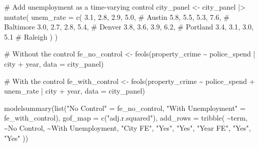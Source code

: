 \documentclass[
  letterpaper,
  DIV=11,
  numbers=noendperiod]{scrreprt}
\newenvironment{Shaded}{\begin{snugshade}}{\end{snugshade}}
\newcommand{\AttributeTok}[1]{\textcolor[rgb]{0.40,0.45,0.13}{#1}}
\newcommand{\CommentTok}[1]{\textcolor[rgb]{0.37,0.37,0.37}{#1}}
\newcommand{\FloatTok}[1]{\textcolor[rgb]{0.68,0.00,0.00}{#1}}
\newcommand{\FunctionTok}[1]{\textcolor[rgb]{0.28,0.35,0.67}{#1}}
\newcommand{\NormalTok}[1]{\textcolor[rgb]{0.00,0.23,0.31}{#1}}
\newcommand{\OtherTok}[1]{\textcolor[rgb]{0.00,0.23,0.31}{#1}}
\newcommand{\SpecialCharTok}[1]{\textcolor[rgb]{0.37,0.37,0.37}{#1}}
\newcommand{\StringTok}[1]{\textcolor[rgb]{0.13,0.47,0.30}{#1}}
\begin{document}
\begin{Shaded}
\begin{Highlighting}[]
\CommentTok{\# Add unemployment as a time{-}varying control}
\NormalTok{city\_panel }\OtherTok{\textless{}{-}}\NormalTok{ city\_panel }\SpecialCharTok{|\textgreater{}}
    \FunctionTok{mutate}\NormalTok{(}
        \AttributeTok{unem\_rate =} \FunctionTok{c}\NormalTok{(}
            \FloatTok{3.1}\NormalTok{, }\FloatTok{2.8}\NormalTok{, }\FloatTok{2.9}\NormalTok{, }\FloatTok{5.0}\NormalTok{,   }\CommentTok{\# Austin}
            \FloatTok{5.8}\NormalTok{, }\FloatTok{5.5}\NormalTok{, }\FloatTok{5.3}\NormalTok{, }\FloatTok{7.6}\NormalTok{,   }\CommentTok{\# Baltimore}
            \FloatTok{3.0}\NormalTok{, }\FloatTok{2.7}\NormalTok{, }\FloatTok{2.8}\NormalTok{, }\FloatTok{5.4}\NormalTok{,   }\CommentTok{\# Denver}
            \FloatTok{3.8}\NormalTok{, }\FloatTok{3.6}\NormalTok{, }\FloatTok{3.9}\NormalTok{, }\FloatTok{6.2}\NormalTok{,   }\CommentTok{\# Portland}
            \FloatTok{3.4}\NormalTok{, }\FloatTok{3.1}\NormalTok{, }\FloatTok{3.0}\NormalTok{, }\FloatTok{5.1}    \CommentTok{\# Raleigh}
\NormalTok{        )}
\NormalTok{    )}

\CommentTok{\# Without the control}
\NormalTok{fe\_no\_control }\OtherTok{\textless{}{-}} \FunctionTok{feols}\NormalTok{(property\_crime }\SpecialCharTok{\textasciitilde{}}\NormalTok{ police\_spend }\SpecialCharTok{|}\NormalTok{ city }\SpecialCharTok{+}\NormalTok{ year,}
                       \AttributeTok{data =}\NormalTok{ city\_panel)}

\CommentTok{\# With the control}
\NormalTok{fe\_with\_control }\OtherTok{\textless{}{-}} \FunctionTok{feols}\NormalTok{(property\_crime }\SpecialCharTok{\textasciitilde{}}\NormalTok{ police\_spend }\SpecialCharTok{+}\NormalTok{ unem\_rate }\SpecialCharTok{|}\NormalTok{ city }\SpecialCharTok{+}\NormalTok{ year,}
                         \AttributeTok{data =}\NormalTok{ city\_panel)}

\FunctionTok{modelsummary}\NormalTok{(}\FunctionTok{list}\NormalTok{(}\StringTok{"No Control"} \OtherTok{=}\NormalTok{ fe\_no\_control,}
                  \StringTok{"With Unemployment"} \OtherTok{=}\NormalTok{ fe\_with\_control),}
             \AttributeTok{gof\_map =} \FunctionTok{c}\NormalTok{(}\StringTok{"adj.r.squared"}\NormalTok{),}
             \AttributeTok{add\_rows =} \FunctionTok{tribble}\NormalTok{(}
                 \SpecialCharTok{\textasciitilde{}}\NormalTok{term, }\SpecialCharTok{\textasciitilde{}}\StringTok{\textasciigrave{}}\AttributeTok{No Control}\StringTok{\textasciigrave{}}\NormalTok{, }\SpecialCharTok{\textasciitilde{}}\StringTok{\textasciigrave{}}\AttributeTok{With Unemployment}\StringTok{\textasciigrave{}}\NormalTok{,}
                 \StringTok{"City FE"}\NormalTok{, }\StringTok{"Yes"}\NormalTok{, }\StringTok{"Yes"}\NormalTok{,}
                 \StringTok{"Year FE"}\NormalTok{, }\StringTok{"Yes"}\NormalTok{, }\StringTok{"Yes"}
\NormalTok{             ))}
\end{Highlighting}
\end{Shaded}
\end{document}
